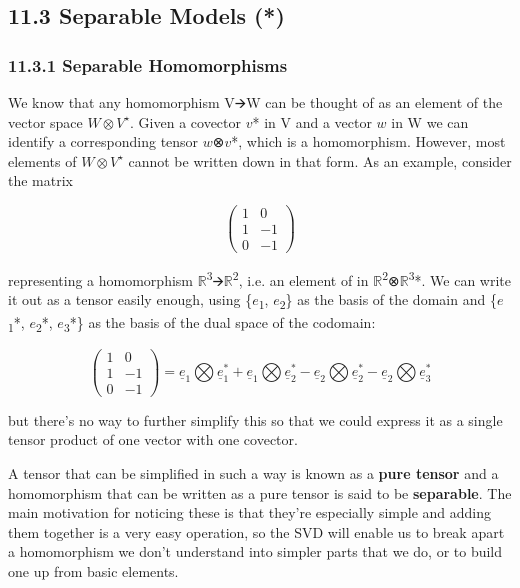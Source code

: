 \documentclass[oneside,english]{amsbook}
\numberwithin{section}{chapter}
\theoremstyle{plain}
\theoremstyle{definition}
\begin{document}
\subsection{11.3 Separable Models (*)}\label{separable-models}

\subsubsection{11.3.1 Separable
	Homomorphisms}\label{separable-homomorphisms}

We know that any homomorphism V🡪W can be thought of as an element of the
vector space $W\otimes V^\star$. Given a covector $v$* in V and a vector $w$ in
W we can identify a corresponding tensor $w$⊗$v$*, which is a
homomorphism. However, most elements of $W\otimes V^\star$ cannot be written down in
that form. As an example, consider the matrix

\[\begin{pmatrix}
	1 & 0 \\
	1 & - 1 \\
	0 & - 1
\end{pmatrix}\]

representing a homomorphism
$\mathbb{R}$\textsuperscript{3}🡪$\mathbb{R}$\textsuperscript{2}, i.e. an
element of in
$\mathbb{R}$\textsuperscript{2}⊗$\mathbb{R}$\textsuperscript{3}*. We can
write it out as a tensor easily enough, using \{$e$\textsubscript{1},
$e$\textsubscript{2}\} as the basis of the domain and
\{$e$\textsubscript{1}*, $e$\textsubscript{2}*,
$e$\textsubscript{3}*\} as the basis of the dual space of the
codomain:

\[\begin{pmatrix}
	1 & 0 \\
	1 & - 1 \\
	0 & - 1
\end{pmatrix} = {\underline{e}}_{1}\bigotimes{\underline{e}}_{1}^{*} + {\underline{e}}_{1}\bigotimes{\underline{e}}_{2}^{*} - {\underline{e}}_{2}\bigotimes{\underline{e}}_{2}^{*} - {\underline{e}}_{2}\bigotimes{\underline{e}}_{3}^{*}\]

but there's no way to further simplify this so that we could express it
as a single tensor product of one vector with one covector.

A tensor that can be simplified in such a way is known as a \textbf{pure
	tensor} and a homomorphism that can be written as a pure tensor is said
to be \textbf{separable}. The main motivation for noticing these is that
they're especially simple and adding them together is a very easy
operation, so the SVD will enable us to break apart a homomorphism we
don't understand into simpler parts that we do, or to build one up from
basic elements.
\end{document}
